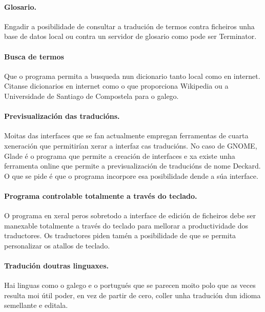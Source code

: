 	\paragraph{Glosario.} Engadir a posibilidade de consultar a tradución de termos contra ficheiros unha base de datos local ou contra un servidor de glosario como pode ser Terminator.

	\paragraph{Busca de termos} Que o programa permita a busqueda nun dicionario tanto local como en internet. Citanse dicionarios en internet como o que proporciona Wikipedia ou a Universidade de Santiago de Compostela para o galego.

	\paragraph{Previsualización das traducións.} Moitas das interfaces que se fan actualmente empregan ferramentas de cuarta xeneración que permitirían xerar a interfaz cas traducións. No caso de GNOME, Glade é o programa que permite a creación de interfaces e xa existe unha ferramenta online que permite a previsualización de traducións de nome Deckard. O que se pide é que o programa incorpore esa posibilidade dende a súa interface.

	\paragraph{Programa controlable totalmente a través do teclado.} O programa en xeral peros sobretodo a interface de edición de ficheiros debe ser manexable totalmente a través do teclado para mellorar a productividade dos traductores. Os traductores piden tamén a posibilidade de que se permita personalizar os atallos de teclado.

	\paragraph{Tradución doutras linguaxes.} Hai linguas como o galego e o portugués que se parecen moito polo que as veces resulta moi útil poder, en vez de partir de cero, coller unha tradución dun idioma semellante e editala.

